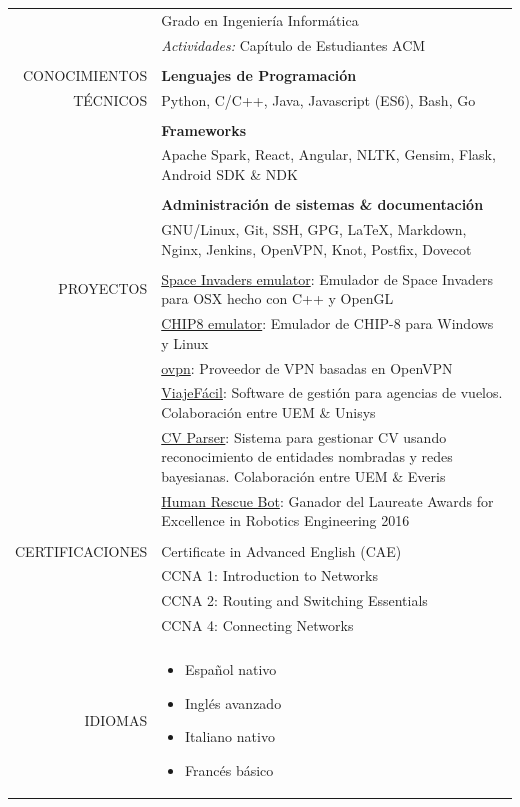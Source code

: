 \documentclass[a4paper, 12pt]{article}
\begin{document}
\begin{longtable}{r|p{12cm}}
    & Grado en Ingeniería Informática
    \\
    & \textit{Actividades:} Capítulo de Estudiantes ACM
    \\\\
    CONOCIMIENTOS
    & \textbf{Lenguajes de Programación}
    \\
    TÉCNICOS
    & Python, C/C++, Java, Javascript (ES6), Bash, Go
    \\\\
    & \textbf{Frameworks}
    \\
    & Apache Spark, React, Angular, NLTK, Gensim, Flask, Android SDK \& NDK
    \\\\
    & \textbf{Administración de sistemas \& documentación}
    \\
    & GNU/Linux, Git, SSH, GPG, \LaTeX, Markdown, Nginx, Jenkins, OpenVPN, Knot, Postfix, Dovecot
    \\\\
    PROYECTOS
    & \href{https://github.com/hugo19941994/space-invaders-emu}{Space Invaders emulator}: Emulador de Space Invaders para OSX hecho con C++ y OpenGL
    \\
    & \href{https://github.com/hugo19941994/chip8-emu}{CHIP8 emulator}: Emulador de CHIP-8 para Windows y Linux
    \\
    & \href{https://vpn.hugofs.com}{ovpn}: Proveedor de VPN basadas en OpenVPN
    \\
    & \href{https://github.com/hugo19941994/ViajeFacil}{ViajeFácil}: Software de gestión para agencias de vuelos. Colaboración entre UEM \& Unisys
    \\
    & \href{https://github.com/hugo19941994/cv-parser}{CV Parser}: Sistema para gestionar CV usando reconocimiento de entidades nombradas y redes bayesianas. Colaboración entre UEM \& Everis
    \\
    & \href{https://github.com/hugo19941994/robot}{Human Rescue Bot}: Ganador del Laureate Awards for Excellence in Robotics Engineering 2016
    \\\\
    CERTIFICACIONES
    & Certificate in Advanced English (CAE)
    \\
    & CCNA 1: Introduction to Networks
    \\
    & CCNA 2: Routing and Switching Essentials
    \\
    & CCNA 4: Connecting Networks
    \\\\
    IDIOMAS
    & \vspace{-1.85\baselineskip} %
    \begin{multicols}{2}
        \begin{itemize}[leftmargin=0cm, label={}, noitemsep]
            \item Español nativo
            \item Inglés avanzado
            \item Italiano nativo
            \item Francés básico
        \end{itemize}
    \end{multicols}
\end{longtable}
\end{document}
